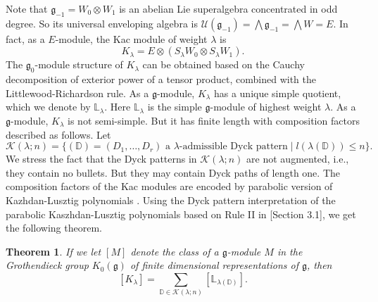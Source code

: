 \documentclass[12pt]{amsart}
\newtheorem{thm}{Theorem}[section]
\theoremstyle{definition}
\theoremstyle{remark}
\newcommand{\bbD}{\mathbb{D}}
\newcommand{\cK}{\mathcal{K}}
\newcommand{\bbL}{\mathbb{L}}
\newcommand{\cU}{\mathcal{U}}
\newcommand{\fg}{\mathfrak{g}}
\newcommand{\DS}{\displaystyle}
\numberwithin{equation}{section}
\begin{document}
Note that $\fg_{-1} = W_0 \otimes W_1$ is an abelian Lie superalgebra concentrated in odd degree. So its universal enveloping algebra is $\cU(\fg_{-1}) = \bigwedge \fg_{-1} = \bigwedge W = E$. In fact, as a $E$-module, the Kac module of weight $\lambda$ is
\begin{equation}
    K_{\lambda} = E \otimes (S_{\lambda} W_0 \otimes S_{\lambda} W_1).
\end{equation}
The $\fg_0$-module structure of $K_{\lambda}$ can be obtained based on the Cauchy decomposition of exterior power of a tensor product, combined with the Littlewood-Richardson rule. As a $\fg$-module, $K_{\lambda}$ has a unique simple quotient, which we denote by $\bbL_{\lambda}$. Here $\bbL_{\lambda}$ is the simple $\fg$-module of highest weight $\lambda$. As a $\fg$-module, $K_{\lambda}$ is not semi-simple. But it has finite length with composition factors described as follows. Let
\begin{equation} \label{def:Klambdan}
    \cK(\lambda;n) = \{ (\bbD) = (D_1,\ldots,D_r) \mbox{ a $\lambda$-admissible Dyck pattern} \mid l(\lambda(\bbD)) \leq n \}.
\end{equation}
We stress the fact that the Dyck patterns in $\cK(\lambda;n)$ are not augmented, i.e., they contain no bullets. But they may contain Dyck paths of length one. The composition factors of the Kac modules are encoded by parabolic version of Kazhdan-Lusztig polynomials \cite{Bru03} \cite{Ser96}. Using the Dyck pattern interpretation of the parabolic Kaszhdan-Lusztig polynomials based on Rule II in \cite{SZJ12}[Section 3.1], we get the following theorem.

\begin{thm} \label{thm:CompositionSeriesKacModule}
If we let $[M]$ denote the class of a $\fg$-module $M$ in the Grothendieck group $K_0(\fg)$ of finite dimensional representations of $\fg$, then
\begin{equation}
\DS    [K_{\lambda}] = \sum_{\bbD \in \cK(\lambda;n)} [\bbL_{\lambda(\bbD)}]. 
\end{equation}
\end{thm}
\end{document}
